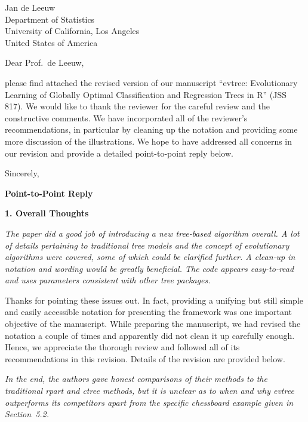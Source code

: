\documentclass[DIN, pagenumber=false, parskip=half,%
               fromalign=left, fromphone=true,%
               fromemail=true, fromurl=false, %
               fromlogo=true, fromrule=false, fromrule=afteraddress]{scrlttr2}
\begin{document}
\begin{letter}{
  Jan de Leeuw\\
  Department of Statistics\\
  University of California, Los Angeles\\
  United States of America
}

\opening{Dear Prof.~de Leeuw,}

please find attached the revised version of our manuscript
``evtree: Evolutionary Learning of Globally Optimal Classification and Regression Trees in R''
(JSS 817). We would like to thank the reviewer for the careful review and the constructive
comments. We have incorporated all of the reviewer's recommendations, in particular by
cleaning up the notation and providing some more discussion of the illustrations. We
hope to have addressed all concerns in our revision and provide a detailed
point-to-point reply below.

Sincerely,\\[-2cm]
\closing{}

\end{letter}


\newpage


\textbf{\large Point-to-Point Reply}

\bigskip

\textbf{1. Overall Thoughts}

\textit{The paper did a good job of introducing a new tree-based algorithm
overall. A lot of details pertaining to traditional tree models and the concept
of evolutionary algorithms were covered, some of which could be clarified
further. A clean-up in notation and wording would be greatly beneficial. The
code appears easy-to-read and uses parameters consistent with other tree
packages.}

Thanks for pointing these issues out. In fact, providing a unifying but still
simple and easily accessible notation for presenting the framework was one
important objective of the manuscript. While preparing the manuscript, we had
revised the notation a couple of times and apparently did not clean it up
carefully enough. Hence, we appreciate the thorough review and followed
all of its recommendations in this revision. Details of the revision are
provided below.

\medskip

\textit{In the end, the authors gave honest comparisons of their methods to the
traditional rpart and ctree methods, but it is unclear as to when and why evtree
outperforms its competitors apart from the specific chessboard example given in
Section~5.2.}
\end{document}
